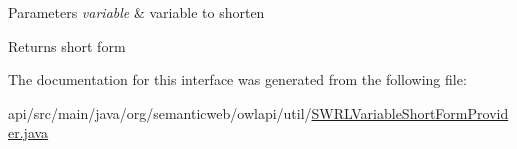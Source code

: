 \begin{DoxyParams}{Parameters}
{\em variable} & variable to shorten \\
\hline
\end{DoxyParams}
\begin{DoxyReturn}{Returns}
short form 
\end{DoxyReturn}


The documentation for this interface was generated from the following file\-:\begin{DoxyCompactItemize}
\item 
api/src/main/java/org/semanticweb/owlapi/util/\hyperlink{_s_w_r_l_variable_short_form_provider_8java}{S\-W\-R\-L\-Variable\-Short\-Form\-Provider.\-java}\end{DoxyCompactItemize}
